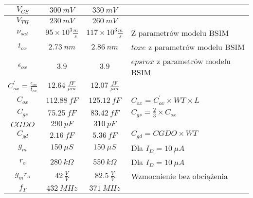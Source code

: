 \documentclass[twoside,pl,final]{labman}
\begin{document}
\begin{table}[htbp]
\begin{tabular}{ || c | c | c | p{} || }
    $V_{GS}$                & $300~mV$                     & $330~mV$       &                                              \\ \hline
    $V_{TH}$                & $230~mV$                     & $260~mV$       &                                              \\ \hline
    $\nu_{sat}$             & $95 \times 10^3 \frac{m}{s}$ & $117 \times 10^3 \frac{m}{s}$ & Z parametrów modelu BSIM      \\ \hline
    $t_{ox}$                & $2.73~nm$                    & $2.86~nm$      & $toxe$ z parametrów modelu BSIM              \\ \hline
    $\epsilon_{ox}$         & $3.9$                        & $3.9$          & $epsrox$ z parametrów modelu BSIM            \\ \hline
    $C_{ox}^\prime = \frac{\epsilon_{ox}}{t_{ox}}$
                            & $12.64~\frac{fF}{\mu{}m}$    & $12.07~\frac{fF}{\mu{}m}$ & \\ \hline
    $C_{ox}$                & $112.88~fF$                  & $125.12~fF$        & $C_{ox} = C_{ox}^\prime \times WT \times L$  \\ \hline
    $C_{gs}$                & $75.25~fF$                   & $83.42~fF$         & $C_{gs} = \frac{2}{3} \times C_{ox}$         \\ \hline
    $CGDO$                  & $290~pF$                     & $310~pF$           &                                              \\ \hline
    $C_{gd}$                & $2.16~fF$                    & $5.36~fF$          & $C_{gd} = CGDO \times WT$                    \\ \hline
    $g_{m}$                 & $150~\mu{}S$                 & $150~\mu{}S$       & Dla $I_D = 10~\mu{}A$                        \\ \hline
    $r_{o}$                 & $280~k\Omega$                & $550~k\Omega$      & Dla $I_D = 10~\mu{}A$                        \\ \hline
    $g_mr_o$                & $42~\frac{V}{V}$             & $82.5~\frac{V}{V}$ & Wzmocnienie bez obciążenia                   \\ \hline
    $f_T$                   & $432~MHz$                    & $371~MHz$          & \\
    \hline \hline
  \end{tabular}
\end{table}



\end{document}

